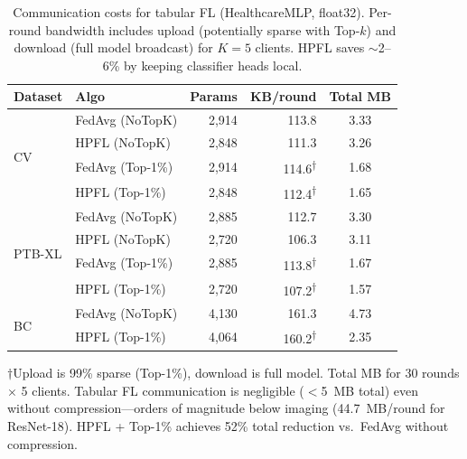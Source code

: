 \documentclass[conference,a4paper]{IEEEtran}
\begin{document}

\begin{table}[htbp]
\centering
\caption{Communication costs for tabular FL (HealthcareMLP, float32). Per-round bandwidth includes upload (potentially sparse with Top-$k$) and download (full model broadcast) for $K{=}5$ clients. HPFL saves $\sim$2--6\% by keeping classifier heads local.}
\label{tab:comm_costs}
\small
\begin{tabular}{llrrc}
\toprule
\textbf{Dataset} & \textbf{Algo} & \textbf{Params} & \textbf{KB/round} & \textbf{Total MB} \\
\midrule
\multirow{4}{*}{CV} & FedAvg (NoTopK) & 2,914 & 113.8 & 3.33 \\
 & HPFL (NoTopK) & 2,848 & 111.3 & 3.26 \\
 & FedAvg (Top-1\%) & 2,914 & 114.6\textsuperscript{$\dagger$} & 1.68 \\
 & HPFL (Top-1\%) & 2,848 & 112.4\textsuperscript{$\dagger$} & 1.65 \\
\midrule
\multirow{4}{*}{PTB-XL} & FedAvg (NoTopK) & 2,885 & 112.7 & 3.30 \\
 & HPFL (NoTopK) & 2,720 & 106.3 & 3.11 \\
 & FedAvg (Top-1\%) & 2,885 & 113.8\textsuperscript{$\dagger$} & 1.67 \\
 & HPFL (Top-1\%) & 2,720 & 107.2\textsuperscript{$\dagger$} & 1.57 \\
\midrule
\multirow{2}{*}{BC} & FedAvg (NoTopK) & 4,130 & 161.3 & 4.73 \\
 & HPFL (Top-1\%) & 4,064 & 160.2\textsuperscript{$\dagger$} & 2.35 \\
\bottomrule
\end{tabular}

\vspace{1mm}
\footnotesize{$\dagger$Upload is 99\% sparse (Top-1\%), download is full model. Total MB for 30 rounds $\times$ 5 clients. Tabular FL communication is negligible ($<$5~MB total) even without compression---orders of magnitude below imaging (44.7~MB/round for ResNet-18). HPFL + Top-1\% achieves 52\% total reduction vs.\ FedAvg without compression.}
\end{table}

\end{document}
